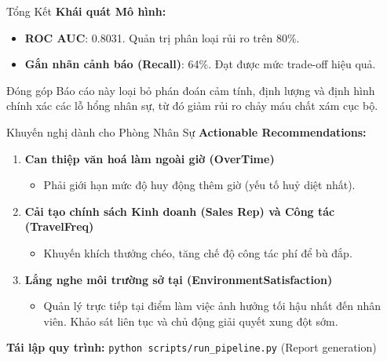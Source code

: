 \begin{frame}{Tổng Kết}
  \textbf{Khái quát Mô hình:}
  
  \vspace{0.3cm}
  \begin{itemize}
    \item \textcolor{accentblue}{\textbf{ROC AUC}}: 0.8031. Quản trị phân loại rủi ro trên 80\%.
    \item \textcolor{accentblue}{\textbf{Gắn nhãn cảnh báo (Recall)}}: 64\%. Đạt được mức trade-off hiệu quả.
  \end{itemize}
  
  \vspace{0.4cm}
  \begin{alertblock}{Đóng góp}
    Báo cáo này loại bỏ phán đoán cảm tính, định lượng và định hình chính xác các lỗ hổng nhân sự, từ đó giảm rủi ro chảy máu chất xám cục bộ.
  \end{alertblock}
\end{frame}

\begin{frame}{Khuyến nghị dành cho Phòng Nhân Sự}
  \textbf{Actionable Recommendations:}
  
  \vspace{0.3cm}
  \begin{enumerate}
    \item \textbf{Can thiệp văn hoá làm ngoài giờ (OverTime)}
    \begin{itemize}
      \item Phải giới hạn mức độ huy động thêm giờ (yếu tố huỷ diệt nhất).
    \end{itemize}
    
    \vspace{0.2cm}
    \item \textbf{Cải tạo chính sách Kinh doanh (Sales Rep) và Công tác (TravelFreq)}
    \begin{itemize}
      \item Khuyến khích thưởng chéo, tăng chế độ công tác phí để bù đắp.
    \end{itemize}
    
    \vspace{0.2cm}
    \item \textbf{Lắng nghe môi trường sở tại (EnvironmentSatisfaction)}
    \begin{itemize}
      \item Quản lý trực tiếp tại điểm làm việc ảnh hưởng tối hậu nhất đến nhân viên. Khảo sát liên tục và chủ động giải quyết xung đột sớm.
    \end{itemize}
  \end{enumerate}
  
  \vspace{0.4cm}
  \textbf{Tái lập quy trình:} \texttt{python scripts/run\_pipeline.py} (Report generation)
\end{frame}
